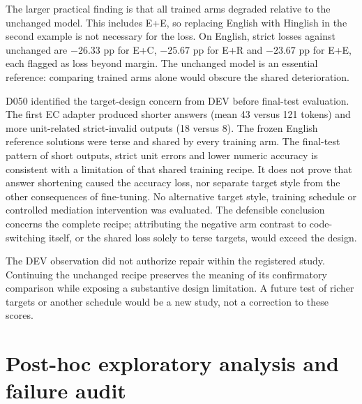 The larger practical finding is that all trained arms degraded relative to the unchanged model. This includes E+E, so replacing English with Hinglish in the second example is not necessary for the loss. On English, strict losses against unchanged are $-26.33$ pp for E+C, $-25.67$ pp for E+R and $-23.67$ pp for E+E, each flagged as loss beyond margin. The unchanged model is an essential reference: comparing trained arms alone would obscure the shared deterioration.

D050 identified the target-design concern from DEV before final-test evaluation. The first EC adapter produced shorter answers (mean 43 versus 121 tokens) and more unit-related strict-invalid outputs (18 versus 8). The frozen English reference solutions were terse and shared by every training arm. The final-test pattern of short outputs, strict unit errors and lower numeric accuracy is consistent with a limitation of that shared training recipe. It does not prove that answer shortening caused the accuracy loss, nor separate target style from the other consequences of fine-tuning. No alternative target style, training schedule or controlled mediation intervention was evaluated. The defensible conclusion concerns the complete recipe; attributing the negative arm contrast to code-switching itself, or the shared loss solely to terse targets, would exceed the design.

The DEV observation did not authorize repair within the registered study. Continuing the unchanged recipe preserves the meaning of its confirmatory comparison while exposing a substantive design limitation. A future test of richer targets or another schedule would be a new study, not a correction to these scores.

\section{Post-hoc exploratory analysis and failure audit}
\label{sec:phase2-posthoc}


